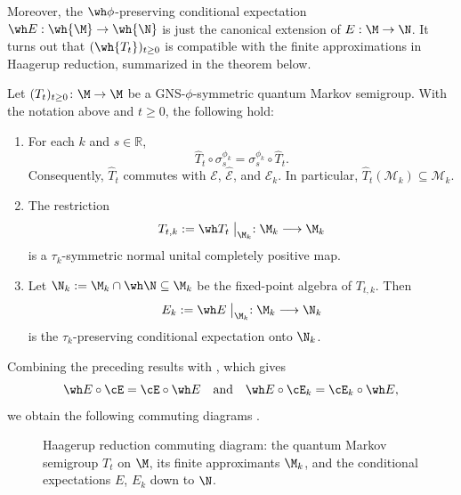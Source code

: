 \documentclass[sn-mathphys-num]{sn-jnl}
\begin{document}
Moreover, the $\wh\phi$-preserving conditional expectation $\wh E:\wh{\M}\to\wh{\N}$
 is just the canonical extension of $E:\M\to\N$. It turns out that $(\wh{T_t})_{t\ge0}$ is compatible with the finite approximations in Haagerup reduction, summarized in the theorem below.
\begin{theorem}\label{thm:fn-multiplicative-domain}
  Let $(T_t)_{t\ge0}\colon \M\to\M$ be a GNS-$\phi$-symmetric quantum Markov semigroup. With the notation above and $t\ge0$, the following hold:
  \begin{enumerate}[label=(\roman*)]
    \item For each $k$ and $s\in \mathbb R$,
\[
\widehat T_t\circ \sigma_s^{\phi_k}
=
\sigma_s^{\phi_k}\circ \widehat T_t .
\]
Consequently, $\widehat T_t$ commutes with $\mathcal E$, $\widehat{\mathcal E}$, and
$\mathcal E_k$. In particular, $\widehat T_t(\mathcal M_k)\subseteq \mathcal M_k$.
\item The restriction
      \[
        T_{t,k} := \wh T_t\bigm|_{\M_k}
         : \M_k \longrightarrow \M_k
      \]
      is a $\tau_k$-symmetric normal unital completely positive map.
    \item Let $\N_k:=\M_k\cap\wh\N\subseteq \M_k$ be the fixed-point algebra of $T_{t,k}$.  Then
      \[
        E_k := \wh E\bigm|_{\M_k}
         : \M_k \longrightarrow \N_k
      \]
      is the $\tau_k$-preserving conditional expectation onto $\N_k$.
  \end{enumerate}
\end{theorem}

Combining the preceding results with \cite[Eq.~(6.4)]{haagerup2009reductionmethodnoncommutativelpspaces}, which gives
\[
\wh E\circ\cE=\cE\circ\wh E
\quad\text{and}\quad
\wh E\circ\cE_k=\cE_k\circ\wh E,
\]
we obtain the following commuting diagrams .
\begin{figure}[htbp]
  \centering
{}
\caption{Haagerup reduction commuting diagram: the quantum Markov semigroup $T_t$ on $\M$, its finite approximants $\M_k$, and the conditional expectations $E$, $E_k$ down to $\N$.}  \label{fig:haagerup-arrows}
\end{figure}
\end{document}
